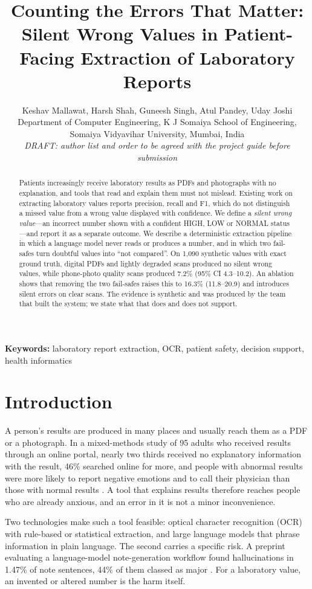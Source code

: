 \documentclass[10pt,twocolumn]{article}
\title{\vspace{-0.4in}\bfseries Counting the Errors That Matter: Silent Wrong Values in Patient-Facing Extraction of Laboratory Reports}
\author{
Keshav Mallawat, Harsh Shah, Guneesh Singh, Atul Pandey, Uday Joshi\\
\small Department of Computer Engineering, K J Somaiya School of Engineering, Somaiya Vidyavihar University, Mumbai, India\\
\small \textit{DRAFT: author list and order to be agreed with the project guide before submission}
}
\date{}
\begin{document}
\maketitle
\vspace{-0.3in}

\begin{abstract}
Patients increasingly receive laboratory results as PDFs and photographs with no explanation, and tools that read and explain them must not mislead. Existing work on extracting laboratory values reports precision, recall and F1, which do not distinguish a missed value from a wrong value displayed with confidence. We define a \emph{silent wrong value}---an incorrect number shown with a confident HIGH, LOW or NORMAL status---and report it as a separate outcome. We describe a deterministic extraction pipeline in which a language model never reads or produces a number, and in which two fail-safes turn doubtful values into ``not compared''. On 1,090 synthetic values with exact ground truth, digital PDFs and lightly degraded scans produced no silent wrong values, while phone-photo quality scans produced 7.2\% (95\% CI 4.3--10.2). An ablation shows that removing the two fail-safes raises this to 16.3\% (11.8--20.9) and introduces silent errors on clear scans. The evidence is synthetic and was produced by the team that built the system; we state what that does and does not support.
\end{abstract}

\noindent\textbf{Keywords:} laboratory report extraction, OCR, patient safety, decision support, health informatics

\section{Introduction}
A person's results are produced in many places and usually reach them as a PDF or a photograph. In a mixed-methods study of 95 adults who received results through an online portal, nearly two thirds received no explanatory information with the result, 46\% searched online for more, and people with abnormal results were more likely to report negative emotions and to call their physician than those with normal results \cite{giardina}. A tool that explains results therefore reaches people who are already anxious, and an error in it is not a minor inconvenience.

Two technologies make such a tool feasible: optical character recognition (OCR) with rule-based or statistical extraction, and large language models that phrase information in plain language. The second carries a specific risk. A preprint evaluating a language-model note-generation workflow found hallucinations in 1.47\% of note sentences, 44\% of them classed as major \cite{llmhalluc}. For a laboratory value, an invented or altered number is the harm itself.
\end{document}
